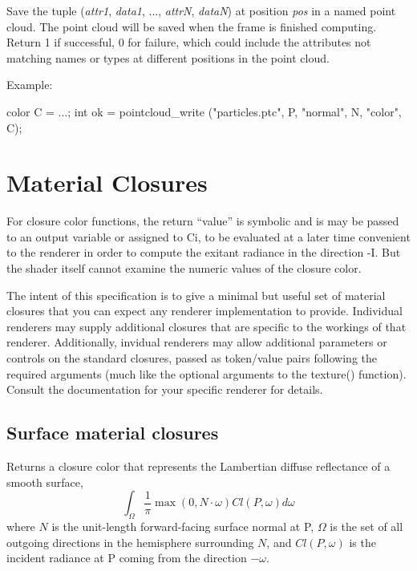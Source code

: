 \documentclass[11pt,letterpaper]{book}
\def\Ci{{\cf Ci}\xspace}
\def\P{{\cf P}\xspace}
\def\colorclosure{{\cf closure color}\xspace}
\def\closurecolor{{\cf closure color}\xspace}
\begin{document}

Save the tuple (\emph{attr1}, \emph{data1}, ..., \emph{attrN},
\emph{dataN}) at position \emph{pos} in a named point cloud.  The point
cloud will be saved when the frame is finished computing.  Return 1 if
successful, 0 for failure, which could include the attributes not
matching names or types at different positions in the point cloud.

Example:
\begin{code}
      color C = ...;
      int ok = pointcloud_write ("particles.ptc", P, "normal", N, "color", C);
\end{code}
\apiend


\newpage
\section{Material Closures}
\label{sec:stdlib:light}
\label{sec:stdlib:closures}

For \closurecolor functions, the return ``value'' is symbolic and is may
be passed to an output variable or assigned to \Ci, to be evaluated at a
later time convenient to the renderer in order to compute the exitant
radiance in the direction {\cf -I}.  But the shader itself cannot
examine the numeric values of the \colorclosure.

The intent of this specification is to give a minimal but useful set of
material closures that you can expect any renderer implementation to
provide.  Individual renderers may supply additional closures that are
specific to the workings of that renderer.  Additionally, invidual
renderers may allow additional parameters or controls on the standard
closures, passed as token/value pairs following the required arguments
(much like the optional arguments to the {\cf texture()} function).
Consult the documentation for your specific renderer for details.



\subsection{Surface material closures}

\apiitem{\colorclosure\ {\ce diffuse} (normal N)}
Returns a \colorclosure that represents the Lambertian diffuse
reflectance of a smooth surface,
$$ \int_{\Omega}{\frac{1}{\pi} \max(0, N \cdot \omega) Cl(P,\omega) d\omega} $$
where $N$ is the unit-length forward-facing surface normal at \P,
$\Omega$ is the set of all outgoing directions in the hemisphere
surrounding $N$, and $Cl(P,\omega)$ is the incident radiance at
\P coming from the direction $-\omega$.
\apiend
\end{document}
